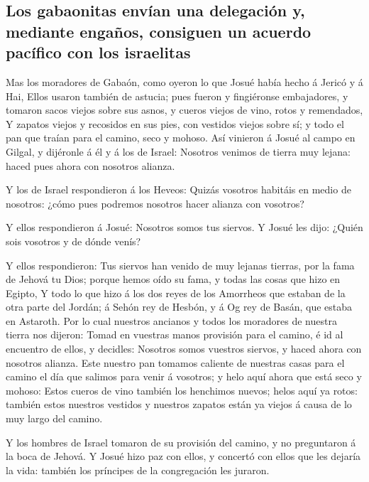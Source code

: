 \hypertarget{los-gabaonitas-envuxedan-una-delegaciuxf3n-y-mediante-engauxf1os-consiguen-un-acuerdo-pacuxedfico-con-los-israelitas}{%
\subsection{Los gabaonitas envían una delegación y, mediante engaños,
consiguen un acuerdo pacífico con los
israelitas}\label{los-gabaonitas-envuxedan-una-delegaciuxf3n-y-mediante-engauxf1os-consiguen-un-acuerdo-pacuxedfico-con-los-israelitas}}

 Mas los moradores de Gabaón, como oyeron lo que Josué había
hecho á Jericó y á Hai,  Ellos usaron también de astucia;
pues fueron y fingiéronse embajadores, y tomaron sacos viejos sobre sus
asnos, y cueros viejos de vino, rotos y remendados,  Y
zapatos viejos y recosidos en sus pies, con vestidos viejos sobre sí; y
todo el pan que traían para el camino, seco y mohoso.  Así
vinieron á Josué al campo en Gilgal, y dijéronle á él y á los de Israel:
Nosotros venimos de tierra muy lejana: haced pues ahora con nosotros
alianza.

 Y los de Israel respondieron á los Heveos: Quizás vosotros
habitáis en medio de nosotros: ¿cómo pues podremos nosotros hacer
alianza con vosotros?

 Y ellos respondieron á Josué: Nosotros somos tus siervos. Y
Josué les dijo: ¿Quién sois vosotros y de dónde venís?

 Y ellos respondieron: Tus siervos han venido de muy lejanas
tierras, por la fama de Jehová tu Dios; porque hemos oído su fama, y
todas las cosas que hizo en Egipto,  Y todo lo que hizo á
los dos reyes de los Amorrheos que estaban de la otra parte del Jordán;
á Sehón rey de Hesbón, y á Og rey de Basán, que estaba en Astaroth.
 Por lo cual nuestros ancianos y todos los moradores de
nuestra tierra nos dijeron: Tomad en vuestras manos provisión para el
camino, é id al encuentro de ellos, y decidles: Nosotros somos vuestros
siervos, y haced ahora con nosotros alianza.  Este nuestro
pan tomamos caliente de nuestras casas para el camino el día que salimos
para venir á vosotros; y helo aquí ahora que está seco y mohoso:
 Estos cueros de vino también los henchimos nuevos; helos
aquí ya rotos: también estos nuestros vestidos y nuestros zapatos están
ya viejos á causa de lo muy largo del camino.

 Y los hombres de Israel tomaron de su provisión del
camino, y no preguntaron á la boca de Jehová.  Y Josué hizo
paz con ellos, y concertó con ellos que les dejaría la vida: también los
príncipes de la congregación les juraron.

